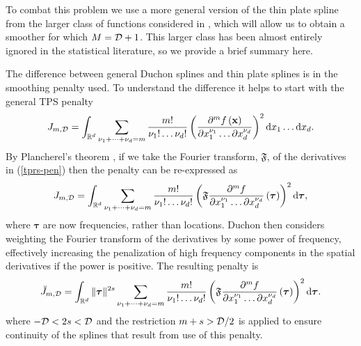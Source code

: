 \documentclass[smallextended]{svjour3}       %
\begin{document}
To combat this problem we use a more general version of the thin plate spline from the larger class of functions considered in \cite{Duchon:1977tr}, which will allow us to obtain a smoother for which $M = {\cal D} + 1$. This larger class has been almost entirely ignored in the statistical literature, so we provide a brief summary here. 

The difference between general Duchon splines and thin plate splines is in the smoothing penalty used. To understand the difference it helps to start with the general TPS penalty
\begin{equation}
J_{m,{\cal D}} = \int_{\mathbb{R}^d} \sum_{\nu_1 + \dots + \nu_d=m} \frac{m!}{\nu_1! \dots \nu_d!} \left( \frac{\partial^m f \left (\mathbf{x} \right )}{\partial x_1^{\nu_1} \ldots  \partial x_d^{\nu_d}} \right)^2 \text{d} x_1 \ldots  \text{d} x_d.
\label{tprs-pen}
\end{equation}
By Plancherel's theorem \citep[e.g.][p. 180]{vretblad2003fourier}, if we take the Fourier transform, $\mathfrak{F}$, of the derivatives in (\ref{tprs-pen}) then the penalty can be re-expressed as
\begin{equation}
J_{m,{\cal D}} =  \int_{\mathbb{R}^d} \sum_{\nu_1 + \dots + \nu_d=m} \frac{m!}{\nu_1! \dots \nu_d!} \left ( \mathfrak{F} \frac{\partial^m f}{\partial x_1^{\nu_1} \ldots  \partial x_d^{\nu_d}} \left (  \boldsymbol{\tau}\right ) \right )^2 \text{d} \boldsymbol{\tau},
\label{tprs-pen-ft}
\end{equation}
where $\bm \tau$ are now frequencies, rather than locations. Duchon then considers weighting the Fourier transform of the derivatives by some power of frequency, effectively increasing the penalization of high frequency components in the spatial derivatives if the power is positive. The resulting penalty is 
\begin{equation}
\breve{J}_{m,{\cal D}} = \int_{\mathbb{R}^d} \| \boldsymbol{\tau} \|^{2s} \sum_{\nu_1 + \dots + \nu_d=m} \frac{m!}{\nu_1! \dots \nu_d!}\left ( \mathfrak{F} \frac{\partial^m f}{\partial x_1^{\nu_1} \ldots  \partial x_d^{\nu_d}} \left (\boldsymbol{\tau} \right ) \right )^2 \text{d} \boldsymbol{\tau}.
\label{duchon-penalty}
\end{equation}
where $-{\cal D} < 2s < {\cal D}$ and the restriction $m + s > {\cal D}/2$ is applied to ensure continuity of the splines that result from use of this penalty. 
\end{document}

